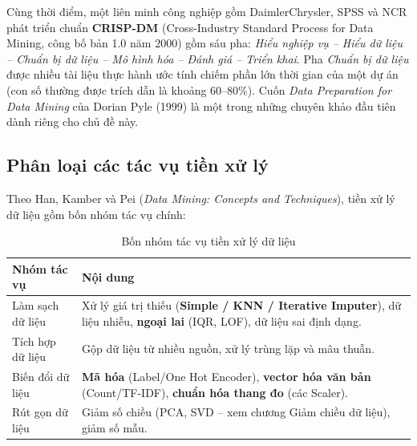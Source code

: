 
Cùng thời điểm, một liên minh công nghiệp gồm DaimlerChrysler, SPSS và NCR phát triển chuẩn \textbf{CRISP-DM} (Cross-Industry Standard Process for Data Mining, công bố bản 1.0 năm 2000) gồm sáu pha: \textit{Hiểu nghiệp vụ -- Hiểu dữ liệu -- Chuẩn bị dữ liệu -- Mô hình hóa -- Đánh giá -- Triển khai}. Pha \textit{Chuẩn bị dữ liệu} được nhiều tài liệu thực hành ước tính chiếm phần lớn thời gian của một dự án (con số thường được trích dẫn là khoảng 60--80\%). Cuốn \textit{Data Preparation for Data Mining} của Dorian Pyle (1999) là một trong những chuyên khảo đầu tiên dành riêng cho chủ đề này.


\subsection{Phân loại các tác vụ tiền xử lý}

Theo Han, Kamber và Pei (\textit{Data Mining: Concepts and Techniques}), tiền xử lý dữ liệu gồm bốn nhóm tác vụ chính:

\begin{table}[H]
\centering
\begin{tabular}{|p{3.2cm}|p{10cm}|}
\hline
\textbf{Nhóm tác vụ} & \textbf{Nội dung} \\
\hline
Làm sạch dữ liệu & Xử lý giá trị thiếu (\textbf{Simple / KNN / Iterative Imputer}), dữ liệu nhiễu, \textbf{ngoại lai} (IQR, LOF), dữ liệu sai định dạng. \\
\hline
Tích hợp dữ liệu & Gộp dữ liệu từ nhiều nguồn, xử lý trùng lặp và mâu thuẫn. \\
\hline
Biến đổi dữ liệu & \textbf{Mã hóa} (Label/One Hot Encoder), \textbf{vector hóa văn bản} (Count/TF-IDF), \textbf{chuẩn hóa thang đo} (các Scaler). \\
\hline
Rút gọn dữ liệu & Giảm số chiều (PCA, SVD -- xem chương Giảm chiều dữ liệu), giảm số mẫu. \\
\hline
\end{tabular}
\caption{Bốn nhóm tác vụ tiền xử lý dữ liệu}
\label{tab:preproc-tasks}
\end{table}

